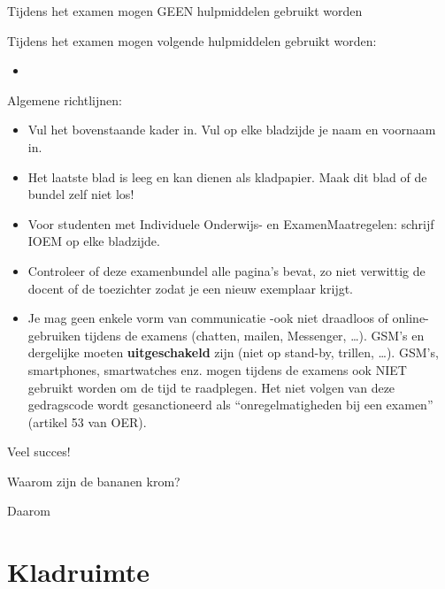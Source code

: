 \documentclass{exam}
\begin{document}
\hoofding


\XBox Tijdens het examen mogen GEEN hulpmiddelen gebruikt worden

\Square Tijdens het examen mogen volgende hulpmiddelen gebruikt worden:
\begin{itemize}
\item 
\end{itemize}

Algemene richtlijnen:

\begin{itemize}
  \item Vul het bovenstaande kader in. Vul op elke bladzijde je naam en voornaam in.
  \item Het laatste blad is leeg en kan dienen als kladpapier. Maak dit blad of de bundel zelf niet los!
  \item Voor studenten met Individuele Onderwijs- en ExamenMaatregelen: schrijf IOEM op elke bladzijde.
  \item Controleer of deze examenbundel alle pagina’s bevat, zo niet verwittig de docent of de toezichter zodat je een nieuw exemplaar krijgt.
  \item Je mag geen enkele vorm van communicatie  -ook niet draadloos of online- gebruiken tijdens de examens (chatten, mailen, Messenger, \ldots). GSM’s en dergelijke moeten \textbf{uitgeschakeld} zijn (niet op stand-by, trillen, \ldots). GSM’s, smartphones, smartwatches enz. mogen tijdens de examens ook NIET gebruikt worden om de tijd te raadplegen. Het niet volgen van deze gedragscode wordt gesanctioneerd als ``onregelmatigheden bij een examen'' (artikel 53 van OER).
\end{itemize}

Veel succes!

\hrulefill

\begin{questions}

\framedsolutions
\ifsolution
  \printanswers
\else
  \noprintanswers
\fi


\question[10] Waarom zijn de bananen krom?

\begin{solutionordottedlines}[1cm]
  Daarom
\end{solutionordottedlines}

\end{questions}

\ifsolution
\else
\newpage
\section*{Kladruimte}

\fi
\end{document}
